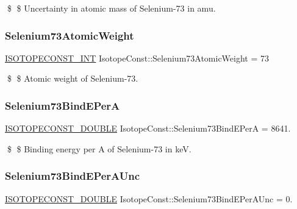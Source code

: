 \$ \$ Uncertainty in atomic mass of Selenium-\/73 in amu. \mbox{\label{group___isotope_const-_selenium-_se73_gace93963ea7fa44bd673e5dbd6d89bbc6}} 
\subsubsection{\texorpdfstring{Selenium73\+Atomic\+Weight}{Selenium73AtomicWeight}}
{\footnotesize\ttfamily \mbox{\hyperlink{group___isotope_const-_macros_ga5f18360b3e99483a35c32d789e62621c}{I\+S\+O\+T\+O\+P\+E\+C\+O\+N\+S\+T\+\_\+\+I\+NT}} Isotope\+Const\+::\+Selenium73\+Atomic\+Weight = 73}

\$ \$ Atomic weight of Selenium-\/73. \mbox{\label{group___isotope_const-_selenium-_se73_gaa1b535de9562abe16df781ebb6b35d82}} 
\subsubsection{\texorpdfstring{Selenium73\+Bind\+E\+PerA}{Selenium73BindEPerA}}
{\footnotesize\ttfamily \mbox{\hyperlink{group___isotope_const-_macros_ga8f45a7272ce02c0b4c65c44636ed719a}{I\+S\+O\+T\+O\+P\+E\+C\+O\+N\+S\+T\+\_\+\+D\+O\+U\+B\+LE}} Isotope\+Const\+::\+Selenium73\+Bind\+E\+PerA = 8641.}

\$ \$ Binding energy per A of Selenium-\/73 in keV. \mbox{\label{group___isotope_const-_selenium-_se73_gaf292051162e9e9a2815c2b42bf415b19}} 
\subsubsection{\texorpdfstring{Selenium73\+Bind\+E\+Per\+A\+Unc}{Selenium73BindEPerAUnc}}
{\footnotesize\ttfamily \mbox{\hyperlink{group___isotope_const-_macros_ga8f45a7272ce02c0b4c65c44636ed719a}{I\+S\+O\+T\+O\+P\+E\+C\+O\+N\+S\+T\+\_\+\+D\+O\+U\+B\+LE}} Isotope\+Const\+::\+Selenium73\+Bind\+E\+Per\+A\+Unc = 0.}


